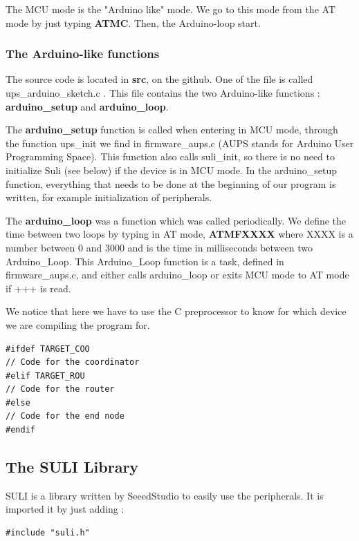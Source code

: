 The MCU mode is the "Arduino like" mode. We go to this mode from the AT mode by just typing \textbf{ATMC}. Then, the Arduino-loop start.

\subsubsection{The Arduino-like functions}

The source code is located in \textbf{src}, on the github. One of the file is called ups\_arduino\_sketch.c . This file contains the two Arduino-like functions : \textbf{arduino\_setup} and \textbf{arduino\_loop}.

The \textbf{arduino\_setup} function is called when entering in MCU mode, through the function ups\_init we find in firmware\_aups.c (AUPS stands for Arduino User Programming Space). This function also calls suli\_init, so there is no need to initialize Suli (see below) if the device is in MCU mode. In the arduino\_setup function, everything that needs to be done at the beginning of our program is written, for example initialization of peripherals.

The \textbf{arduino\_loop} was a function which was called periodically. We define the time between two loops by typing in AT mode, \textbf{ATMFXXXX} where XXXX is a number between 0 and 3000 and is the time in milliseconds between two Arduino\_Loop. This Arduino\_Loop function is a task, defined in firmware\_aups.c, and either calls arduino\_loop or exits MCU mode to AT mode if +++ is read.

We notice that here we have to use the C preprocessor to know for which device we are compiling the program for.

\begin{lstlisting}[frame=single]
#ifdef TARGET_COO
// Code for the coordinator
#elif TARGET_ROU
// Code for the router
#else
// Code for the end node
#endif
\end{lstlisting}

\subsection{The SULI Library}

SULI is a library written by SeeedStudio to easily use the peripherals. It is imported it by just adding :

\begin{lstlisting}[frame=single]
#include "suli.h"
\end{lstlisting}

